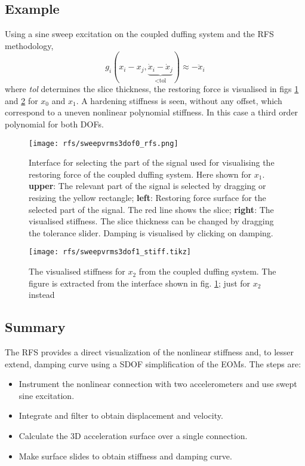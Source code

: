 \subsection{Example}
\label{sec:rfs_example}

Using a sine sweep excitation on the coupled duffing system and the RFS
methodology,
\begin{equation}
  \label{eq:rfs_tol}
  g_i (x_i - x_j , \underbrace{\dot x_i - \dot x_j}_\text{<tol}) \approx - \ddot x_i
\end{equation}
where \textit{tol} determines the slice thickness, the restoring force is
visualised in figs \ref{fig:rfs_full} and \ref{fig:rfs_stiff} for $x_0$ and
$x_1$. A hardening stiffness is seen, without any offset, which correspond to a
uneven nonlinear polynomial stiffness. In this case a third order polynomial for
both DOFs.

\begin{figure}[!ht]
  \centering
  \texttt{[image: rfs/sweepvrms3dof0\_rfs.png]}
  \caption{Interface for selecting the part of the signal used for
    visualising the restoring force of the coupled duffing system. Here shown
    for $x_1$.
    \textbf{upper}: The relevant part of the signal is selected by dragging or
    resizing the yellow rectangle;
    \textbf{left}: Restoring force surface for the selected part of the signal.
    The red line shows the slice;
    \textbf{right}: The visualised stiffness. The slice thickness can be changed
    by dragging the tolerance slider. Damping is visualised by clicking on
    damping.
  }
  \label{fig:rfs_full}
\end{figure}


\begin{figure}[!ht]
  \centering
  \texttt{[image: rfs/sweepvrms3dof1\_stiff.tikz]}
  \caption{The visualised stiffness for $x_2$ from the coupled duffing system.
    The figure is extracted from the interface shown in fig. \ref{fig:rfs_full};
    just for $x_2$ instead}
  \label{fig:rfs_stiff}
\end{figure}

\subsection{Summary}
\label{sec:rfs_summary}

The RFS provides a direct visualization of the nonlinear stiffness and, to
lesser extend, damping curve using a SDOF simplification of the EOMs. The steps
are:
\begin{itemize}
\item Instrument the nonlinear connection with two accelerometers and use swept
  sine excitation.
\item Integrate and filter to obtain displacement and velocity.
\item Calculate the 3D acceleration surface over a single connection.
\item Make surface slides to obtain stiffness and damping curve.
\end{itemize}

